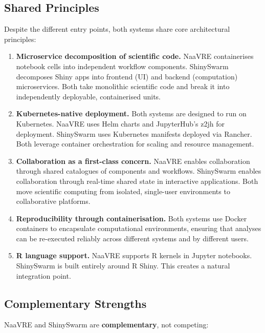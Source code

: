 \documentclass[12pt,a4paper]{article}
\begin{document}
\subsection{Shared Principles}

Despite the different entry points, both systems share core architectural principles:

\begin{enumerate}[nosep]
  \item \textbf{Microservice decomposition of scientific code.} NaaVRE containerises notebook cells into independent workflow components. ShinySwarm decomposes Shiny apps into frontend (UI) and backend (computation) microservices. Both take monolithic scientific code and break it into independently deployable, containerised units.
  
  \item \textbf{Kubernetes-native deployment.} Both systems are designed to run on Kubernetes. NaaVRE uses Helm charts and JupyterHub's z2jh for deployment. ShinySwarm uses Kubernetes manifests deployed via Rancher. Both leverage container orchestration for scaling and resource management.
  
  \item \textbf{Collaboration as a first-class concern.} NaaVRE enables collaboration through shared catalogues of components and workflows. ShinySwarm enables collaboration through real-time shared state in interactive applications. Both move scientific computing from isolated, single-user environments to collaborative platforms.
  
  \item \textbf{Reproducibility through containerisation.} Both systems use Docker containers to encapsulate computational environments, ensuring that analyses can be re-executed reliably across different systems and by different users.
  
  \item \textbf{R language support.} NaaVRE supports R kernels in Jupyter notebooks. ShinySwarm is built entirely around R Shiny. This creates a natural integration point.
\end{enumerate}

\subsection{Complementary Strengths}

NaaVRE and ShinySwarm are \textbf{complementary}, not competing:
\end{document}

